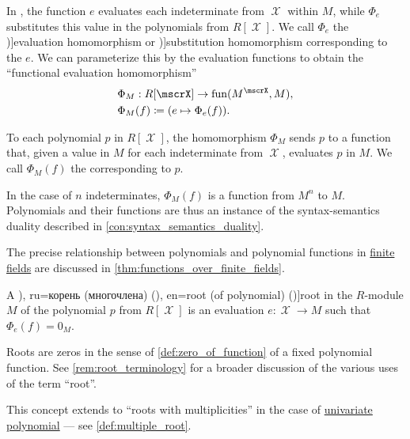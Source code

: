 \begin{concept}\label{con:evaluation_homomorphism}\mimprovised
  In , the function \( e \) evaluates each indeterminate from \( \mscrX \) within \( M \), while \( \Phi_e \) substitutes this value in the polynomials from \( R[\mscrX] \). We call \( \Phi_e \) the \term[en=evaluation homomorphism (\cite[98]{Lang2002Algebra})]{evaluation homomorphism} or \term[en=substitution homomorphism (\cite[151]{Knapp2016BasicAlgebra})]{substitution homomorphism} corresponding to the  \( e \). We can parameterize this by the evaluation functions to obtain the \enquote{functional evaluation homomorphism}
  \begin{equation*}
    \begin{aligned}
      &\Phi_M: R[\mscrX] \to \fun(M^\mscrX, M), \\
      &\Phi_M(f) \coloneqq (e \mapsto \Phi_e(f)).
    \end{aligned}
  \end{equation*}

  To each polynomial \( p \) in \( R[\mscrX] \), the homomorphism \( \Phi_M \) sends \( p \) to a function that, given a value in \( M \) for each indeterminate from \( \mscrX \), evaluates \( p \) in \( M \). We call \( \Phi_M(f) \) the  corresponding to \( p \).

  In the case of \( n \) indeterminates, \( \Phi_M(f) \) is a function from \( M^n \) to \( M \). Polynomials and their functions are thus an instance of the syntax-semantics duality described in \cref{con:syntax_semantics_duality}.

  The precise relationship between polynomials and polynomial functions in \hyperref[thm:finite_fields]{finite fields} are discussed in \cref{thm:functions_over_finite_fields}.
\end{concept}

\begin{definition}\label{def:root_of_polynomial}\mimprovised
  A \term[bg=корен (на уравнение) (\cite[2]{Обрешков1962ВисшаАлгебра}), ru=корень (многочлена) (\cite[99]{Винберг2014КурсАлгебры}), en=root (of polynomial) (\cite[281]{Aluffi2009Algebra})]{root} in the \( R \)-module \( M \) of the polynomial \( p \) from \( R[\mscrX] \) is an evaluation \( e: \mscrX \to M \) such that \( \Phi_e(f) = 0_M \).
\end{definition}
\begin{comments}
  \item Roots are zeros in the sense of \cref{def:zero_of_function} of a fixed polynomial function. See \cref{rem:root_terminology} for a broader discussion of the various uses of the term \enquote{root}.

  \item This concept extends to \enquote{roots with multiplicities} in the case of \hyperref[def:univariate_polynomial]{univariate polynomial} --- see \cref{def:multiple_root}.
\end{comments}

